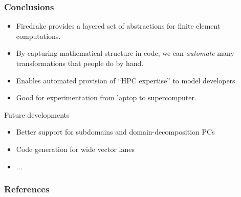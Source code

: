 \documentclass[presentation]{beamer}
\begin{document}
\begin{frame}
  \frametitle{Conclusions}
  \begin{itemize}
  \item Firedrake provides a layered set of abstractions for finite
    element computations.
  \item By capturing mathematical structure in code, we can
    \emph{automate} many transformations that people do by hand.
  \item Enables automated provision of ``HPC expertise'' to model
    developers.
  \item Good for experimentation from laptop to supercomputer.
  \end{itemize}
  \begin{block}{Future developments}
    \begin{itemize}
    \item Better support for subdomains and domain-decomposition PCs
    \item Code generation for wide vector lanes
    \item ...
    \end{itemize}
  \end{block}
\end{frame}

\appendix
\begin{frame}[t]
  \frametitle{References}
  \printbibliography[heading=none]
\end{frame}
\end{document}
